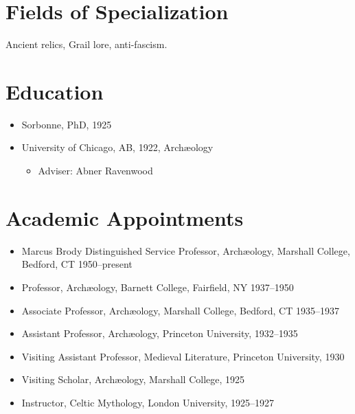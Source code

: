 \documentclass[margin,line]{res}
\date{2018-04-19}
\def\tightlist{} %
\renewcommand{\subsection}[1]{\section{#1}}
\begin{document}
  \begin{resume}
\hypertarget{fields-of-specialization}{%
\subsection{Fields of Specialization}\label{fields-of-specialization}}

Ancient relics, Grail lore, anti-fascism.

\hypertarget{education}{%
\subsection{Education}\label{education}}

\begin{itemize}
\tightlist
\item
  Sorbonne, PhD, 1925
\item
  University of Chicago, AB, 1922, Archæology

  \begin{itemize}
  \tightlist
  \item
    Adviser: Abner Ravenwood
  \end{itemize}
\end{itemize}

\hypertarget{academic-appointments}{%
\subsection{Academic Appointments}\label{academic-appointments}}

\begin{itemize}
\tightlist
\item
  Marcus Brody Distinguished Service Professor, Archæology, Marshall
  College, Bedford, CT 1950--present
\item
  Professor, Archæology, Barnett College, Fairfield, NY 1937--1950
\item
  Associate Professor, Archæology, Marshall College, Bedford, CT
  1935--1937
\item
  Assistant Professor, Archæology, Princeton University, 1932--1935
\item
  Visiting Assistant Professor, Medieval Literature, Princeton
  University, 1930
\item
  Visiting Scholar, Archæology, Marshall College, 1925
\item
  Instructor, Celtic Mythology, London University, 1925--1927
\end{itemize}

\hypertarget{publications}{%
}
\end{resume}
\end{document}
